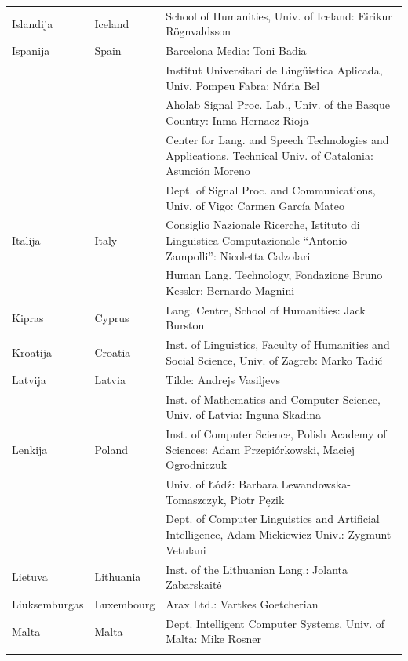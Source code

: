 \documentclass[]{../metanetpaper}
\begin{document}
\begin{longtable}{llp{105mm}}
  Islandija & \textcolor{grey1}{Iceland} & School of Humanities, Univ. of Iceland: Eirikur Rögnvaldsson\\ \addlinespace
  Ispanija & \textcolor{grey1}{Spain} & Barcelona Media: Toni Badia \\ \addlinespace 
  & & Institut Universitari de Lingüistica Aplicada, Univ. Pompeu Fabra: Núria Bel \\ \addlinespace 
  & & Aholab Signal Proc. Lab., Univ. of the Basque Country: Inma Hernaez Rioja \\ \addlinespace 
  & & Center for Lang. and Speech Technologies and Applications, Technical Univ. of Catalonia: Asunción Moreno \\ \addlinespace 
  & & Dept. of Signal Proc. and Communications, Univ. of Vigo: Carmen García Mateo \\ \addlinespace 
  Italija & \textcolor{grey1}{Italy} & Consiglio Nazionale Ricerche, Istituto di Linguistica Computazionale “Antonio Zampolli”: Nicoletta Calzolari\\ \addlinespace
  & & Human Lang. Technology, Fondazione Bruno Kessler: Bernardo Magnini\\ \addlinespace 
  Kipras & \textcolor{grey1}{Cyprus} & Lang. Centre, School of Humanities: Jack Burston\\ \addlinespace
  Kroatija & \textcolor{grey1}{Croatia} & Inst. of Linguistics, Faculty of Humanities and Social Science, Univ. of Zagreb: Marko Tadić \\ \addlinespace
  Latvija & \textcolor{grey1}{Latvia} & Tilde: Andrejs Vasiljevs\\ \addlinespace 
  & & Inst. of Mathematics and Computer Science, Univ. of Latvia: Inguna Skadina\\ \addlinespace
  Lenkija & \textcolor{grey1}{Poland} & Inst. of Computer Science, Polish Academy of Sciences: Adam Przepiórkowski, Maciej Ogrodniczuk \\ \addlinespace
  & & Univ. of Łódź: Barbara Lewandowska-Tomaszczyk, Piotr Pęzik\\ \addlinespace
  & & Dept. of Computer Linguistics and Artificial Intelligence, Adam Mickiewicz Univ.: Zygmunt Vetulani \\ \addlinespace
  Lietuva & \textcolor{grey1}{Lithuania} & Inst. of the Lithuanian Lang.: Jolanta Zabarskaitė\\ \addlinespace
  Liuksemburgas & \textcolor{grey1}{Luxembourg} & Arax Ltd.: Vartkes Goetcherian\\ \addlinespace
  Malta & \textcolor{grey1}{Malta} & Dept. Intelligent Computer Systems, Univ. of Malta: Mike Rosner\\ \addlinespace

\end{longtable}
\end{document}

